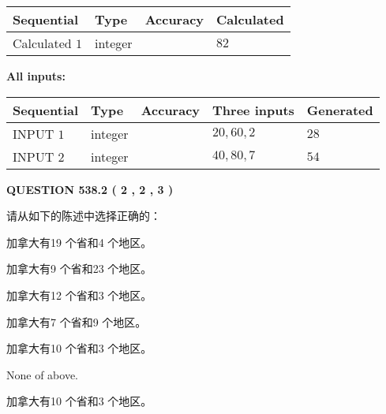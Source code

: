 \documentclass{ctexart}
\begin{document}
  
\noindent\begin{tabular}{|l|l|l|l|}
\hline
 Sequential & Type & Accuracy & Calculated \\ 
\hline
 
 
  Calculated $  1 $ & integer &  & 
  $ 82 $ 
 \\  \hline  
 \end{tabular}
   
   
   
   
\noindent\vspace{0.1in}\hspace{-0.08in} {\textbf{\Large{All inputs: }}}
   
   
  
  
\noindent\begin{tabular}{|l|l|l|l|l|}
\hline
 Sequential & Type & Accuracy & Three inputs & Generated \\ 
\hline
 
 
  INPUT $  1 $ & integer &  & $
 20
 , 
 60
 , 
 2
 $ & $ 28 $ 
 \\  \hline  
 
 
  INPUT $  2 $ & integer &  & $
 40
 , 
 80
 , 
 7
 $ & $ 54 $ 
 \\  \hline  
 \end{tabular}
   
   
  
\vspace{0.2in}
  
{\textbf{\Large{QUESTION
538.2 
 ( 2 , 2 , 3 )
}}}
  
  
请从如下的陈述中选择正确的：
 
 
加拿大有19 个省和4 个地区。
 
 
加拿大有9 个省和23 个地区。
 
 
加拿大有12 个省和3 个地区。
 
 
加拿大有7 个省和9 个地区。
 
 
加拿大有10 个省和3 个地区。
 
 
 None of above.
 
 
\noindent{}
 
 
加拿大有10 个省和3 个地区。
 
 
\noindent{}
 
\end{document}
